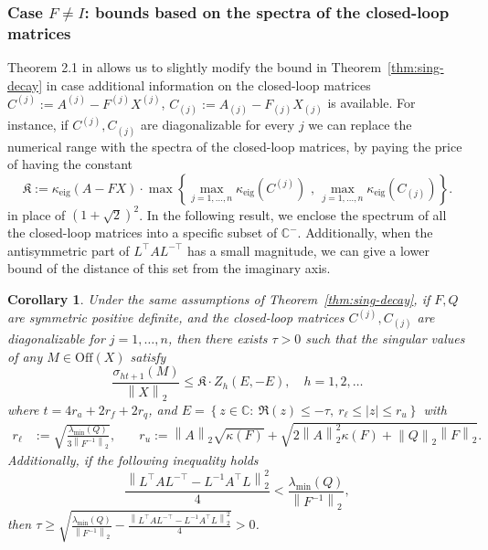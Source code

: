 \documentclass[a4paper,10pt]{article}
\newcommand{\norm}[1]{\left\lVert#1\right\rVert}
\newtheorem{corollary}[definition]{Corollary}
\newcommand{\upd}[1]{{\color{black}#1}} %
\begin{document}
\subsubsection{Case $F\neq I$: bounds based on the spectra of the closed-loop matrices}
Theorem 2.1 in \cite{beckermann17} allows us to slightly modify
the bound in Theorem~\ref{thm:sing-decay}  in case additional information on the closed-loop matrices $C^{(j)}:=A^{(j)}-F^{(j)}X^{(j)}$, $C_{(j)}:=A_{(j)}-F_{(j)}X_{(j)}$ is available. For instance, if $C^{(j)},C_{(j)}$ are diagonalizable for every $j$ we can replace the numerical range with the spectra of the closed-loop matrices, by paying the price of having the constant 
$$
\mathfrak K:=\kappa_{\mathrm{eig}}(A-FX)\cdot \max\left\{\max_{j=1,\dots, n}\kappa_{\mathrm{eig}}(C^{(j)})\, \, ,\, \max_{j=1,\dots, n}\kappa_{\mathrm{eig}}(C_{(j)})\right\}. 
$$
in place of $(1+\sqrt 2)^2$. In the following result, we enclose the spectrum of all the closed-loop matrices into a specific subset of $\mathbb C^-$. Additionally, when the antisymmetric part of $L^{\top}AL^{-\top}$ has a small magnitude, we can give a lower bound of the distance of this set from the imaginary axis.
\begin{corollary}\label{cor:sing-decay4}
	 Under the same assumptions of Theorem~\ref{thm:sing-decay}, if $F,Q$ are symmetric positive definite, and the closed-loop matrices $C^{(j)},C_{(j)}$ are diagonalizable for $j=1,\dots,n$,
	  then there \upd{exists} $\tau>0$ such that the singular values of any $M\in\mathrm{Off}(X)$ satisfy
	$$
	\frac{\sigma_{ht+1}(M)}{\norm{X}_2}\le \mathfrak K\cdot
	Z_h(E,-E),%
	\quad h=1,2,\dots 
	$$
	where $t=4r_a+2r_f+2r_q$, and $E=\left\{z\in\mathbb C:\ \Re(z)\le -\tau,\  r_\ell\le |z|\le r_u \right\}$
	with 
	\begin{align*}
		r_\ell&:= \sqrt{\frac{\lambda_{\min}(Q)}{3\norm{F^{-1}}_2}},&\quad
		r_u:= \norm{A}_2\sqrt{\kappa(F)}+\sqrt{2\norm{A}_2^2\kappa(F)+\norm{Q}_2\norm{F}_2}.
	\end{align*}
Additionally, if the following inequality holds
\begin{equation}\label{eq:antisym}
\frac{\norm{L^{\top}AL^{-\top} - L^{-1}A^\top L}_2^2}4<\frac{\lambda_{\min}(Q)}{\norm{F^{-1}}_2}, 
\end{equation}
then  $\tau\ge\sqrt{\frac{\lambda_{\min}(Q)}{\norm{F^{-1}}_2}-\frac{\norm{L^{\top}AL^{-\top} - L^{-1}A^\top L}_2^2}4}>0$.
\end{corollary}
\end{document}
